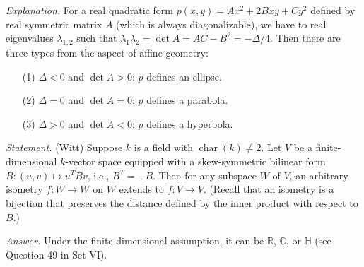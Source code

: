 \documentclass{mathproblems}
\newcommand\C{\mathbb{C}}
\newcommand\R{\mathbb{R}}
\begin{document}
\begin{questions}
\textit{Explanation.} For a real quadratic form $p(x,y)=Ax^2+2Bxy+Cy^2$ defined by real symmetric matrix $A$ (which is always diagonalizable), we have to real eigenvalues $\lambda_{1,2}$ such that $\lambda_1\lambda_2=\det A=AC-B^2=-\Delta/4$. Then there are three types from the aspect of affine geometry: \vspace{-6pt}
\begin{itemize}
\item[(1)] $\Delta<0$ and $\det A>0$: $p$ defines an ellipse. \vspace{-4pt}

\item[(2)] $\Delta=0$ and $\det A=0$: $p$ defines a parabola. \vspace{-4pt}

\item[(3)] $\Delta>0$ and $\det A<0$: $p$ defines a hyperbola.
\end{itemize}



\textit{Statement.} (Witt) Suppose $k$ is a field with $\operatorname{char}(k)\neq 2$. Let $V$ be a finite-dimensional $k$-vector space equipped with a skew-symmetric bilinear form $B:(u,v)\mapsto u^T B v$, i.e., $B^T=-B$. Then for any subspace $W$ of $V$, an arbitrary isometry $f:W\to W$ on $W$ extends to $\tilde f:V\to V$. (Recall that an isometry is a bijection that preserves the distance defined by the inner product with respect to $B$.)


\textit{Answer.} Under the finite-dimensional assumption, it can be $\R$, $\C$, or $\mathbb{H}$ (see Question 49 in Set VI).




\end{questions}
\end{document}
